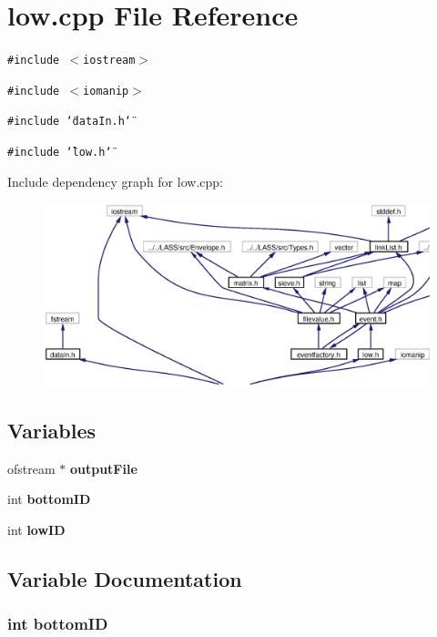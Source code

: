 \section{low.cpp File Reference}
\label{low_8cpp}
{\tt \#include $<$iostream$>$}\par
{\tt \#include $<$iomanip$>$}\par
{\tt \#include \char`\"{}data\-In.h\char`\"{}}\par
{\tt \#include \char`\"{}low.h\char`\"{}}\par


Include dependency graph for low.cpp:\begin{figure}[H]
\begin{center}
\leavevmode
\includegraphics[width=355pt]{low_8cpp__incl}
\end{center}
\end{figure}
\subsection*{Variables}
\begin{CompactItemize}
\item 
ofstream $\ast$ {\bf output\-File}
\item 
int {\bf bottom\-ID}
\item 
int {\bf low\-ID}
\end{CompactItemize}


\subsection{Variable Documentation}
\subsubsection{\setlength{\rightskip}{0pt plus 5cm}int {\bf bottom\-ID}}\label{low_8cpp_a1}




